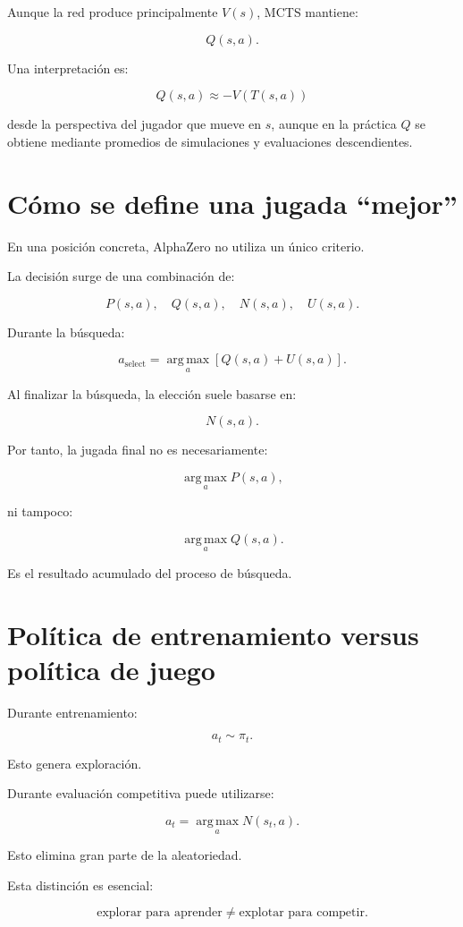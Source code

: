 \documentclass[11pt,a4paper]{article}
\newcommand{\argmax}{\operatorname*{arg\,max}}
\begin{document}
Aunque la red produce principalmente \(V(s)\), MCTS mantiene:

\[
Q(s,a).
\]

Una interpretación es:

\[
Q(s,a)
\approx
- V(T(s,a))
\]

desde la perspectiva del jugador que mueve en \(s\), aunque en la práctica \(Q\) se obtiene mediante promedios de simulaciones y evaluaciones descendientes.

\section{Cómo se define una jugada ``mejor''}

En una posición concreta, AlphaZero no utiliza un único criterio.

La decisión surge de una combinación de:

\[
P(s,a),
\quad
Q(s,a),
\quad
N(s,a),
\quad
U(s,a).
\]

Durante la búsqueda:

\[
a_{\mathrm{select}}
=
\argmax_a
\left[
Q(s,a)+U(s,a)
\right].
\]

Al finalizar la búsqueda, la elección suele basarse en:

\[
N(s,a).
\]

Por tanto, la jugada final no es necesariamente:

\[
\argmax_a P(s,a),
\]

ni tampoco:

\[
\argmax_a Q(s,a).
\]

Es el resultado acumulado del proceso de búsqueda.

\section{Política de entrenamiento versus política de juego}

Durante entrenamiento:

\[
a_t\sim \pi_t.
\]

Esto genera exploración.

Durante evaluación competitiva puede utilizarse:

\[
a_t
=
\argmax_a N(s_t,a).
\]

Esto elimina gran parte de la aleatoriedad.

Esta distinción es esencial:

\[
\text{explorar para aprender}
\neq
\text{explotar para competir}.
\]
\end{document}

